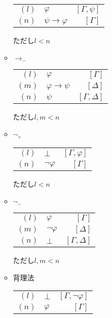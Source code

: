 \documentclass[10pt,b5paper,papersize,dvipdfmx]{jsbook}
\begin{document}
\begin{itemize}
\begin{itemize}
\begin{table}[H]
\begin{center}
\begin{tabular}{rlr}
$(l)$&$\varphi$&$[\Gamma,\psi]$ \\
$(n)$&$\psi \to \varphi$&$[\Gamma]$ \\
\end{tabular}
\end{center}
\end{table}
ただし$l<n$
\item $\to_-$
\begin{table}[H]
\begin{center}
\begin{tabular}{rlr}
$(l)$&$\varphi$&$[\Gamma]$ \\
$(m)$&$\varphi \to \psi$&$[\Delta]$ \\
$(n)$&$\psi$&$[\Gamma,\Delta]$
\end{tabular}
\end{center}
\end{table}
ただし$l,m<n$
\item $\lnot_+$
\begin{table}[H]
\begin{center}
\begin{tabular}{rlr}
$(l)$&$\bot$&$[\Gamma,\varphi]$ \\
$(n)$&$\lnot \varphi$&$[\Gamma]$
\end{tabular}
\end{center}
\end{table}
ただし$l<n$
\item $\lnot_-$
\begin{table}[H]
\begin{center}
\begin{tabular}{rlr}
$(l)$&$\varphi$&$[\Gamma]$ \\
$(m)$&$\lnot \varphi$&$[\Delta]$ \\
$(n)$&$\bot$&$[\Gamma,\Delta]$
\end{tabular}
\end{center}
\end{table}
ただし$l,m<n$
\item 背理法
\begin{table}[H]
\begin{center}
\begin{tabular}{rlr}
$(l)$&$\bot$&$[\Gamma,\lnot \varphi]$ \\
$(n)$&$\varphi$&$[\Gamma]$
\end{tabular}
\end{center}
\end{table}

\end{itemize}
\end{itemize}
\end{document}
